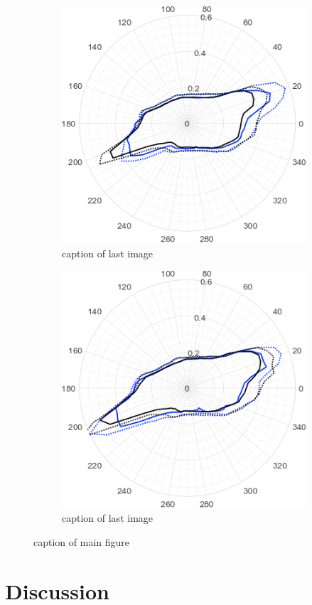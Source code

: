 \begin{figure}
\begin{subfigure}[t]{0.49\textwidth}
        \includegraphics[width=0.8\linewidth]{STYLESTUFF/round04Ang.png}
    \caption{caption of last image} 
    \end{subfigure}
    \begin{subfigure}[t]{0.49\textwidth}
     \centering
        \includegraphics[width=0.8\linewidth]{STYLESTUFF/round05Ang.png}
    \caption{caption of last image} 
    \end{subfigure}
    \caption{caption of main figure}
\end{figure}
\section{Discussion}
